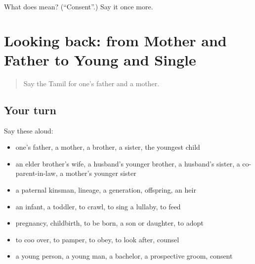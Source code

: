 \begin{tcolorbox}[breakable,colback=teal!4,colframe=teal!35!black,title={Before you move on}]
What does  mean? (\textquotedblleft{}Consent\textquotedblright{}.) Say it once more.
\end{tcolorbox}
\section[(dialogue)]{Looking back: from Mother and Father to Young and Single}

\label{lesson:TA-R498-review-492-498}



\begin{quote}
Say the Tamil for one’s father and a mother.
\end{quote}

\subsection*{Your turn}
Say these aloud:

\begin{itemize}
\raggedright
  \item one’s father, a mother, a brother, a sister, the youngest child
  \item an elder brother’s wife, a husband’s younger brother, a husband’s sister, a co-parent-in-law, a mother’s younger sister
  \item a paternal kinsman, lineage, a generation, offspring, an heir
  \item an infant, a toddler, to crawl, to sing a lullaby, to feed
  \item pregnancy, childbirth, to be born, a son or daughter, to adopt
  \item to coo over, to pamper, to obey, to look after, counsel
  \item a young person, a young man, a bachelor, a prospective groom, consent
\end{itemize}

